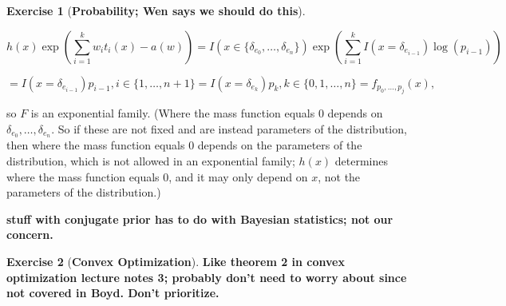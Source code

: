 \documentclass{article}
\theoremstyle{definition}
\newtheorem{exercise}{Exercise}
\theoremstyle{definition}
\theoremstyle{definition}
\theoremstyle{definition}
\begin{document}
\begin{exercise}[\textbf{Probability; Wen says we should do this}]
\begin{enumerate}[(a)]
\[
 h(x) \exp \left( \sum_{i=1}^k w_i t_i(x) - a(w) \right) =  I(x \in \{\delta_{e_0}, \ldots, \delta_{e_n}\}) \exp \left( \sum_{i=1}^k I(x = \delta_{e_{i-1}}) \log(p_{i-1})  \right)
 \]
 
 \[
  = I(x = \delta_{e_{i-1}}) p_{i-1}, i \in \{ 1, \ldots, n + 1\} =  I(x = \delta_{e_{k}}) p_{k}, k \in \{ 0, 1, \ldots, n\} = f_{p_0, \ldots, p_j} (x),
\] 

so \(F\) is an exponential family. (Where the mass function equals 0 depends on \(\delta_{e_0}, \ldots, \delta_{e_n}\). So if these are not fixed and are instead parameters of the distribution, then where the mass function equals 0 depends on the parameters of the distribution, which is not allowed in an exponential family; \(h(x)\) determines where the mass function equals 0, and it may only depend on \(x\), not the parameters of the distribution.)

\textbf{stuff with conjugate prior has to do with Bayesian statistics; not our concern.}

\end{enumerate}

\end{exercise}

\begin{exercise}[\textbf{Convex Optimization}]

\textbf{Like theorem 2 in convex optimization lecture notes 3; probably don't need to worry about since not covered in Boyd. Don't prioritize.}

\end{exercise}
\end{document}
